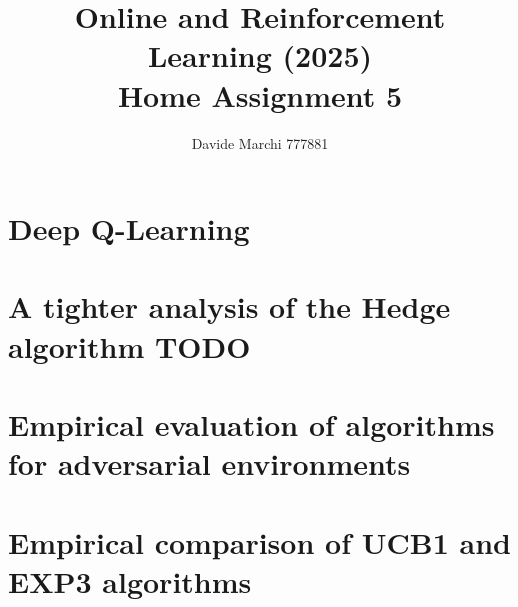 \documentclass[a4paper,12pt]{article}
\begin{document}
\title{Online and Reinforcement Learning (2025)\\Home Assignment 5}
\author{\color{red}Davide Marchi 777881}
\date{}
\maketitle

\tableofcontents %
\newpage %



\section{Deep Q-Learning}


\section{A tighter analysis of the Hedge algorithm TODO}
%

\section{Empirical evaluation of algorithms for adversarial environments}


\section{Empirical comparison of UCB1 and EXP3 algorithms }
%

    
\end{document}
